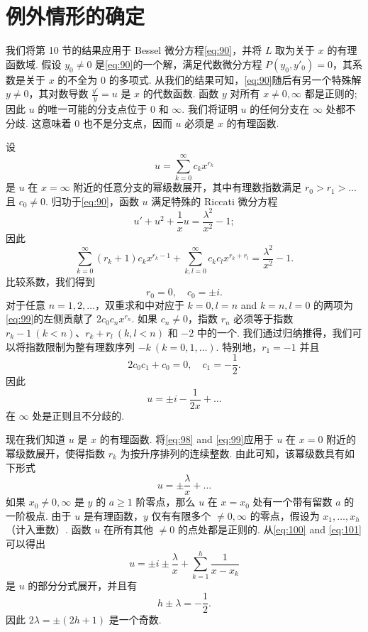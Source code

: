 \section{例外情形的确定}

我们将第 10 节的结果应用于 Bessel 微分方程\eqref{eq:90}，并将 $L$ 取为关于 $x$ 的有理函数域. 假设 $y_0 \neq 0$ 是\eqref{eq:90}的一个解，满足代数微分方程 $P(y_0,y'_0)=0$，其系数是关于 $x$ 的不全为 0 的多项式. 从我们的结果可知，\eqref{eq:90}随后有另一个特殊解 $y \neq 0$，其对数导数 $\frac{y'}{y} = u$ 是 $x$ 的代数函数. 函数 $y$ 对所有 $x \neq 0, \infty$ 都是正则的; 因此 $u$ 的唯一可能的分支点位于 $0$ 和 $\infty$. 我们将证明 $u$ 的任何分支在 $\infty$ 处都不分歧. 这意味着 $0$ 也不是分支点，因而 $u$ 必须是 $x$ 的有理函数.

设
\begin{equation}
u = \sum_{k=0}^{\infty} c_k x^{r_k} \tag{98}\label{eq:98}
\end{equation}
是 $u$ 在 $x=\infty$ 附近的任意分支的幂级数展开，其中有理数指数满足 $r_0 > r_1 > \dots$ 且 $c_0 \neq 0$. 归功于\eqref{eq:90}，函数 $u$ 满足特殊的 Riccati 微分方程
\[u' + u^2 + \frac{1}{x}u = \frac{\lambda^2}{x^2} - 1;\]
因此
\begin{equation}
\sum_{k=0}^{\infty} (r_k+1)c_k x^{r_k-1} + \sum_{k,l=0}^{\infty} c_k c_l x^{r_k+r_l} = \frac{\lambda^2}{x^2} - 1. \tag{99}\label{eq:99}
\end{equation}
比较系数，我们得到
\[r_0 = 0, \quad c_0 = \pm i.\]
对于任意 $n=1,2,\dots$，双重求和中对应于 $k=0, l=n$ and $k=n, l=0$ 的两项为\eqref{eq:99}的左侧贡献了 $2 c_0 c_n x^{r_n}$. 如果 $c_n \neq 0$，指数 $r_n$ 必须等于指数 $r_k-1 \ (k < n)$、$r_k+r_l \ (k, l < n)$ 和 $-2$ 中的一个. 我们通过归纳推得，我们可以将指数限制为整有理数序列 $-k \ (k=0,1,\dots)$. 特别地，$r_1 = -1$ 并且
\[2c_0c_1 + c_0 = 0, \quad c_1 = -\frac{1}{2}.\]
因此
\begin{equation}
u = \pm i - \frac{1}{2x} + \dots \tag{100}\label{eq:100}
\end{equation}
在 $\infty$ 处是正则且不分歧的.

现在我们知道 $u$ 是 $x$ 的有理函数. 将\eqref{eq:98} and \eqref{eq:99}应用于 $u$ 在 $x=0$ 附近的幂级数展开，使得指数 $r_k$ 为按升序排列的连续整数. 由此可知，该幂级数具有如下形式
\begin{equation}
u = \pm \frac{\lambda}{x} + \dots \tag{101}\label{eq:101}
\end{equation}
如果 $x_0 \neq 0, \infty$ 是 $y$ 的 $a \ge 1$ 阶零点，那么 $u$ 在 $x=x_0$ 处有一个带有留数 $a$ 的一阶极点. 由于 $u$ 是有理函数，$y$ 仅有有限多个 $\neq 0, \infty$ 的零点，假设为 $x_1, \dots, x_h$ （计入重数）. 函数 $u$ 在所有其他 $\neq 0$ 的点处都是正则的. 从\eqref{eq:100} and \eqref{eq:101}可以得出
\[u = \pm i \pm \frac{\lambda}{x} + \sum_{k=1}^{h} \frac{1}{x-x_k}\]
是 $u$ 的部分分式展开，并且有
\[h \pm \lambda = -\frac{1}{2}.\]
因此 $2\lambda = \pm (2h+1)$ 是一个奇数.

